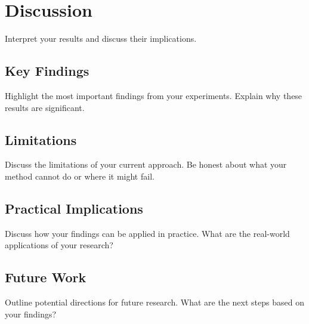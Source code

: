 \section{Discussion}
\label{sec:discussion}

Interpret your results and discuss their implications.

\subsection{Key Findings}
\label{subsec:findings}

Highlight the most important findings from your experiments. Explain why these results are significant.

\subsection{Limitations}
\label{subsec:limitations}

Discuss the limitations of your current approach. Be honest about what your method cannot do or where it might fail.

\subsection{Practical Implications}
\label{subsec:implications}

Discuss how your findings can be applied in practice. What are the real-world applications of your research?

\subsection{Future Work}
\label{subsec:future}

Outline potential directions for future research. What are the next steps based on your findings?
